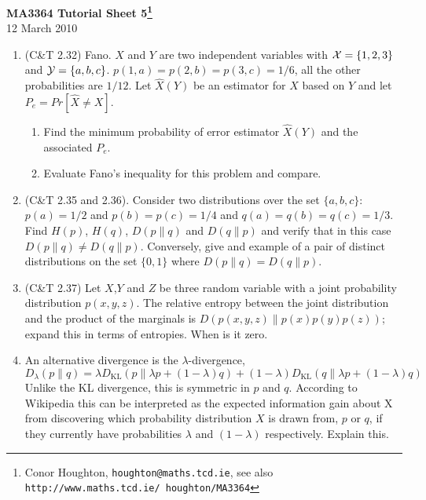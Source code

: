 \documentclass[12pt]{article}
\begin{document}
\begin{center}
{\bf MA3364 Tutorial Sheet 5\footnote{Conor Houghton, {\tt houghton@maths.tcd.ie}, see also {\tt http://www.maths.tcd.ie/ houghton/MA3364}}}\\[1cm]{} 12 March 2010
\end{center}
\begin{enumerate}

\item (C\&T 2.32) Fano. $X$ and $Y$ are two independent variables with ${\cal X}=\{1,2,3\}$ and ${\cal Y}=\{a,b,c\}$. $p(1,a)=p(2,b)=p(3,c)=1/6$, all the other probabilities are $1/12$. Let $\hat{X}(Y)$ be an estimator for $X$ based on $Y$ and let $P_e=Pr[\hat{X}\not=X]$.
\begin{enumerate}
\item Find the minimum probability of error estimator $\hat{X}(Y)$ and the associated $P_e$. 
\item Evaluate Fano's inequality for this problem and compare.
\end{enumerate}

\item (C\&T 2.35 and 2.36). Consider two distributions over the set
  $\{a,b,c\}$: $p(a)=1/2$ and $p(b)=p(c)=1/4$ and
  $q(a)=q(b)=q(c)=1/3$. Find $H(p)$, $H(q)$, $D(p\|q)$ and $D(q\|p)$
  and verify that in this case $D(p\|q)\not=D(q\|p)$. Conversely, give
  and example of a pair of distinct distributions on the set $\{0,1\}$
  where $D(p\|q)=D(q\|p)$.


\item (C\&T 2.37) Let $X$,$Y$ and $Z$ be three random variable with a joint probability distribution $p(x,y,z)$. The relative entropy between the joint distribution and the product of the marginals is $D(p(x,y,z)\|p(x)p(y)p(z))$; expand this in terms of entropies. When is it zero.

\item An alternative divergence is the $\lambda$-divergence,
\begin{equation}
D_{\lambda}(p\|q) = \lambda D_{\mathrm{KL}}(p\|\lambda p + (1-\lambda)q) + (1-\lambda) D_{\mathrm{KL}}(q\|\lambda p + (1-\lambda)q)
\end{equation}
Unlike the KL divergence, this is symmetric in $p$ and $q$. According to Wikipedia this can be interpreted as the expected information gain about X from discovering which probability distribution $X$ is drawn from, $p$ or $q$, if they currently have probabilities $\lambda$ and $(1-\lambda)$ respectively. Explain this.


\end{enumerate}
\end{document}
